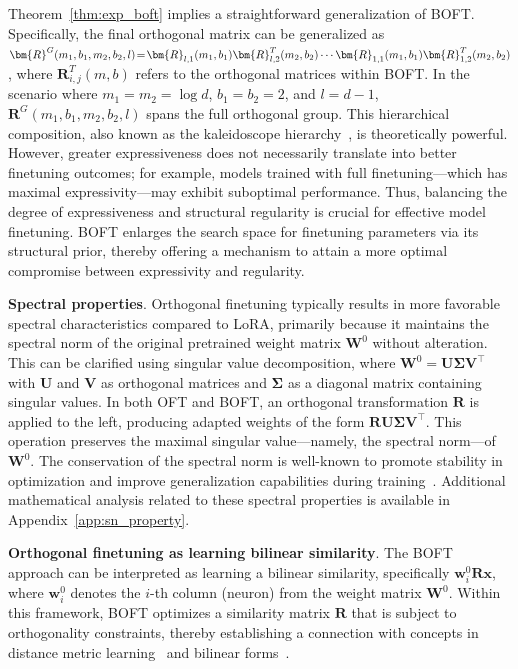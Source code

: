 Theorem~\ref{thm:exp_boft} implies a straightforward generalization of BOFT. Specifically, the final orthogonal matrix can be generalized as $\thickmuskip=2mu \medmuskip=2mu \bm{R}^G(m_1,b_1,m_2,b_2,l)=\bm{R}_{l,1}(m_1,b_1)\bm{R}_{l,2}^T(m_2,b_2)\cdots\bm{R}_{1,1}(m_1,b_1)\bm{R}_{1,2}^T(m_2,b_2)$, where $\bm{R}_{i,j}^T(m,b)$ refers to the orthogonal matrices within BOFT. In the scenario where $m_1=m_2=\log d$, $b_1=b_2=2$, and $l=d-1$, $\bm{R}^G(m_1,b_1,m_2,b_2,l)$ spans the full orthogonal group. This hierarchical composition, also known as the kaleidoscope hierarchy~\cite{dao2019kaleidoscope}, is theoretically powerful. However, greater expressiveness does not necessarily translate into better finetuning outcomes; for example, models trained with full finetuning—which has maximal expressivity—may exhibit suboptimal performance. Thus, balancing the degree of expressiveness and structural regularity is crucial for effective model finetuning. BOFT enlarges the search space for finetuning parameters via its structural prior, thereby offering a mechanism to attain a more optimal compromise between expressivity and regularity.

\textbf{Spectral properties}. Orthogonal finetuning typically results in more favorable spectral characteristics compared to LoRA, primarily because it maintains the spectral norm of the original pretrained weight matrix $\bm{W}^0$ without alteration. This can be clarified using singular value decomposition, where $\bm{W}^0=\bm{U}\bm{\Sigma}\bm{V}^\top$ with $\bm{U}$ and $\bm{V}$ as orthogonal matrices and $\bm{\Sigma}$ as a diagonal matrix containing singular values. In both OFT and BOFT, an orthogonal transformation $\bm{R}$ is applied to the left, producing adapted weights of the form $\bm{R}\bm{U}\bm{\Sigma}\bm{V}^\top$. This operation preserves the maximal singular value—namely, the spectral norm—of $\bm{W}^0$. The conservation of the spectral norm is well-known to promote stability in optimization and improve generalization capabilities during training~\cite{miyato2018spectral,yoshida2017spectral}. Additional mathematical analysis related to these spectral properties is available in Appendix~\ref{app:sn_property}.

\textbf{Orthogonal finetuning as learning bilinear similarity}. The BOFT approach can be interpreted as learning a bilinear similarity, specifically $\bm{w}^0_i\bm{R}\bm{x}$, where $\bm{w}^0_i$ denotes the $i$-th column (neuron) from the weight matrix $\bm{W}^0$. Within this framework, BOFT optimizes a similarity matrix $\bm{R}$ that is subject to orthogonality constraints, thereby establishing a connection with concepts in distance metric learning~\cite{xing2002distance} and bilinear forms~\cite{roman2005advanced}.

